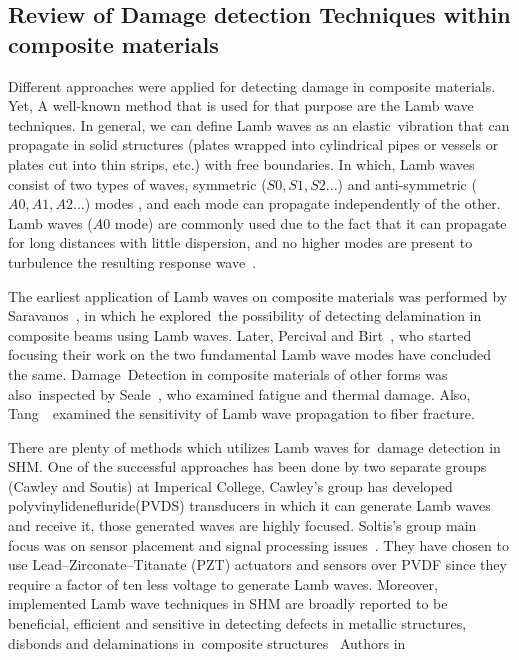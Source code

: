 \documentclass[preprint,10pt]{elsarticle}
\begin{document}
\subsection{Review of Damage detection Techniques within composite materials }	
Different approaches were applied for detecting damage in composite materials. Yet, A well-known method that is used for that purpose are the Lamb wave techniques. In general, we can define Lamb waves as an elastic vibration that can propagate in solid structures (plates wrapped into cylindrical pipes or vessels or plates cut into thin strips, etc.) with free boundaries. In which, Lamb waves consist of two types of waves, symmetric ($S0,S1,S2...$) and anti-symmetric ($A0,A1,A2...$) modes , and each mode can propagate independently of the other. Lamb waves ($A0$ mode) are commonly used due to the fact that it can propagate for long distances with little dispersion, and no higher modes are present to turbulence the resulting response wave~\cite{Valed2000}.
	
The earliest application of Lamb waves on composite materials was performed by Saravanos~\cite{doi:10.2514/6.1994-1754}, in which he explored the possibility of detecting delamination in composite beams using Lamb waves. Later, Percival and Birt~\cite{Percival1997}, who started focusing their work on the two fundamental Lamb wave modes have concluded the same. Damage Detection in composite materials of other forms was also inspected by Seale~\cite{Seale1998}, who examined fatigue and thermal damage. Also, Tang~\cite{Tang1989} examined the sensitivity of Lamb wave propagation to fiber fracture.

There are plenty of methods which utilizes Lamb waves for damage detection in SHM. One of the successful approaches has been done by two separate groups (Cawley and Soutis) at Imperical College, Cawley's group has developed polyvinylidenefluride(PVDS) transducers in which it can generate Lamb waves and receive it, those generated waves are highly focused. Soltis's group main focus was on sensor placement and signal processing issues~\cite{Valed2000,Valed2000a,Valed2001}. They have chosen to use Lead–Zirconate–Titanate (PZT) actuators and sensors over PVDF since they require a factor of ten less voltage to generate Lamb waves. Moreover, implemented Lamb wave techniques in SHM are broadly reported to be beneficial, efficient and sensitive in detecting defects in metallic structures, disbonds and delaminations in composite structures~\cite{Boller2000,Diamanti2004,Su2006,Raghavan2007,Diamanti2007} \newline Authors in~\cite{Ng2009} 
	
\end{document}
